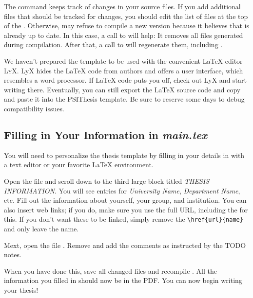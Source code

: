 The  command keeps track of changes in your source files. If you add additional files that should be tracked for changes, you should edit the list of files at the top of the . Otherwise,  may refuse to compile a new version because it believes that  is already up to date. In this case, a call to  will help: It removes all files generated during compilation. After that, a call to  will regenerate them, including .


We haven't prepared the template to be used with the convenient LaTeX editor \textsc{LyX}. LyX hides the LaTeX code from authors and offers a user interface, which resembles a word processor. If LaTeX code puts you off, check out LyX and start writing there. Eventually, you can still export the LaTeX source code and copy and paste it into the PSIThesis template. Be sure to reserve some days to debug compatibility issues.

\subsection{Filling in Your Information in \emph{main.tex}}\label{sec:fillingdetails}

You will need to personalize the thesis template by filling in your details in  with a text editor or your favorite LaTeX environment.

Open the file and scroll down to the third large block titled \emph{THESIS INFORMATION}. You will see entries for \emph{University Name}, \emph{Department Name}, etc. Fill out the information about yourself, your group, and institution.%
You can also insert web links; if you do, make sure you use the full URL, including the  for this. If you don't want these to be linked, simply remove the \verb|\href{url}{name}| and only leave the name.

Mext, open the file . Remove and add the comments as instructed by the TODO notes.

When you have done this, save all changed files and recompile . All the information you filled in should now be in the PDF. You can now begin writing your thesis!


